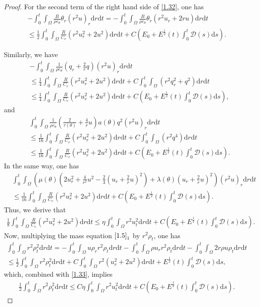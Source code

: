 \documentclass[11pt,reqno]{amsart}
\numberwithin{equation}{section}
\newcommand{\dif}{\mathrm{d}}
\newcommand{\intx}{\int_0^t \int_{\Omega} }
\begin{document}
\begin{proof}
For the second term of the right hand side of \eqref{1.32}, one has
\begin{align*}
-\intx \frac{B}{\rho e_\theta} \theta_r (r^2 u)_r \dif r \dif t =-\intx \frac{B}{\rho e_\theta} \theta_r (r^2 u_r+2ru) \dif r \dif t \\
\le \frac{1}{2} \intx \frac{R}{C_v} (r^2 u_r^2+2u^2)\dif r \dif t +C(E_0+E^\frac{1}{2}(t) \int_0^t  \mathcal D(s)\dif s).
\end{align*}

Similarly, we have
\begin{align*}
&-\intx \frac{1}{\rho e_\theta} (q_r+\frac{2}{r}q) (r^2 u)_r \dif r \dif t \\
&\le \frac{1}{4} \intx \frac{R}{C_v} (r^2 u_r^2+2u^2)\dif r\dif t +C \intx (r^2 q_r^2+q^2)\dif r\dif t \\
&\le \frac{1}{4} \intx \frac{R}{C_v} (r^2 u_r^2+2u^2)\dif r\dif t +C(E_0+E^\frac{1}{2}(t) \int_0^t  \mathcal D(s)\dif s),
\end{align*}
and
\begin{align*}
&\intx \frac{1}{\rho e_\theta} \left( \frac{2}{\tau(\theta)}+\frac{4}{r} u\right) a(\theta) q^2 (r^2 u)_r \dif r \dif t \\
&\le \frac{1}{16} \intx \frac{R}{C_v} (r^2 u_r^2+2u^2)\dif r\dif t +C \intx (r^2 q^4)\dif r\dif t \\
&\le \frac{1}{16} \intx \frac{R}{C_v} (r^2 u_r^2+2u^2)\dif r\dif t +C(E_0+E^\frac{1}{2}(t) \int_0^t  \mathcal D(s)\dif s).
\end{align*}
In the same way, one has
\begin{align*}
&\intx \left(\mu(\theta)\left( 2u_r^2+\frac{4}{r^2}u^2-\frac{2}{3} \left(u_r+\frac{2}{r} u\right)^2\right)+\lambda(\theta)\left(u_r+\frac{2}{r} u\right)^2\right) (r^2 u)_r \dif r \dif t \\
&\le \frac{1}{16} \intx \frac{R}{C_v} (r^2 u_r^2+2u^2)\dif r\dif t +C(E_0+E^\frac{1}{2}(t) \int_0^t  \mathcal D(s)\dif s).
\end{align*}
Thus, we derive that
\begin{align}\label{1.33}
\frac{1}{8} \intx \frac{R}{C_v} (r^2 u_r^2+2u^2)\dif r\dif t \le \eta \intx r^2 u_t^2 \dif r \dif t +C(E_0+E^\frac{1}{2}(t) \int_0^t  \mathcal D(s)\dif s).
\end{align}
Now, multiplying the mass equation $\eqref{1.5}_1$ by $r^2 \rho_t$, one has
\begin{align*}
\intx r^2 \rho_t^2 \dif r\dif t =-\intx u\rho_r r^2 \rho_t \dif r \dif t -\intx \rho u_r r^2 \rho_t \dif r \dif t -\intx 2 r \rho u \rho_t \dif r \dif t\\
\le \frac{1}{2}\intx r^2 \rho_t^2 \dif r \dif t+C\intx r^2(u_r^2+2u^2)\dif r \dif t+E^\frac{1}{2}(t) \int_0^t  \mathcal D(s)\dif s,
\end{align*}
which,  combined with \eqref{1.33}, implies
\begin{align}\label{1.34}
\frac{1}{2} \intx r^2 \rho_t^2 \dif r \dif t \le C \eta \intx r^2 u_t^2\dif r\dif t +C(E_0+E^\frac{1}{2}(t) \int_0^t  \mathcal D(s)\dif s).
\end{align}


\end{proof}
\end{document}
